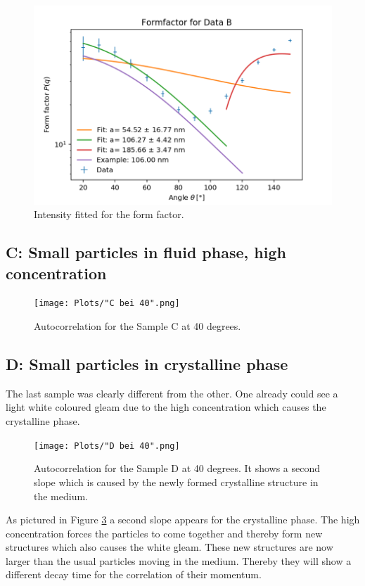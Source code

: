 \documentclass[]{article}
\begin{document}
\begin{figure}[!htbp]
\centering
\includegraphics[width=0.8\linewidth]{Plots/FormB.png}
\caption{Intensity fitted for the form factor.}
\label{FormB}
\end{figure}

\subsection{C: Small particles in fluid phase, high concentration}

\begin{figure}[!htbp]
\centering
\texttt{[image: Plots/"C bei 40".png]}
\caption{Autocorrelation for the Sample C at 40 degrees.}
\label{C}
\end{figure}


\newpage
\subsection{D: Small particles in crystalline phase}
The last sample was clearly different from the other. One already could see a light white coloured gleam due to the high concentration which causes the crystalline phase. 

\begin{figure}[!htbp]
\centering
\texttt{[image: Plots/"D bei 40".png]}
\caption{Autocorrelation for the Sample D at 40 degrees. It shows a second slope which is caused by the newly formed crystalline structure in the medium.}
\label{D}
\end{figure}

As pictured in Figure \ref{D} a second slope appears for the crystalline phase. The high concentration forces the particles to come together and thereby form new structures which also causes the white gleam. These new structures are now larger than the usual particles moving in the medium. Thereby they will show a different decay time for the correlation of their momentum.
\end{document}
